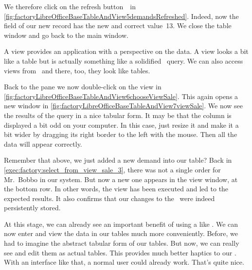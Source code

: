 We therefore click on the refresh button~\libreOfficeBaseRefresh\ in \cref{fig:factoryLibreOfficeBaseTableAndView5demandsRefreshed}.
Indeed, now the  field of our new record has the new and correct value~13.
We close the table window and go back to the main window.

A  view provides an application with a perspective on the data.
A view looks a bit like a table but is actually something like a solidified \sql\ query.
We can also access views from \libreofficeBase\ and there, too, they look like tables.

Back to the  pane we now double-click on the view  in \cref{fig:factoryLibreOfficeBaseTableAndView6chooseViewSale}.
This again opens a new window in \cref{fig:factoryLibreOfficeBaseTableAndView7viewSale}.
We now see the results of the query in a nice tabular form.
It may be that the  column is displayed a bit odd on your computer.
In this case, just resize it and make it a bit wider by dragging its right border to the left with the mouse.
Then all the data will appear correctly.

Remember that above, we just added a new demand into our table?
Back in \cref{exec:factory:select_from_view_sale_3}, there was not a single order for Mr.~Bobbo in our system.
But now a new one appears in the view window, at the bottom row.
In other words, the view has been executed and led to the expected results.
It also confirms that our changes to the \db\ were indeed persistently stored.

At this stage, we can already see an important benefit of using a  like \libreofficeBase.
We can now enter and view the data in our tables much more conveniently.
Before, we had to imagine the abstract tabular form of our tables.
But now, we can really see and edit them as actual tables.
This provides much better haptics to our \db.
With an interface like that, a normal user could already work.
That's quite nice.%
%
\FloatBarrier%
\endhsection%
%
